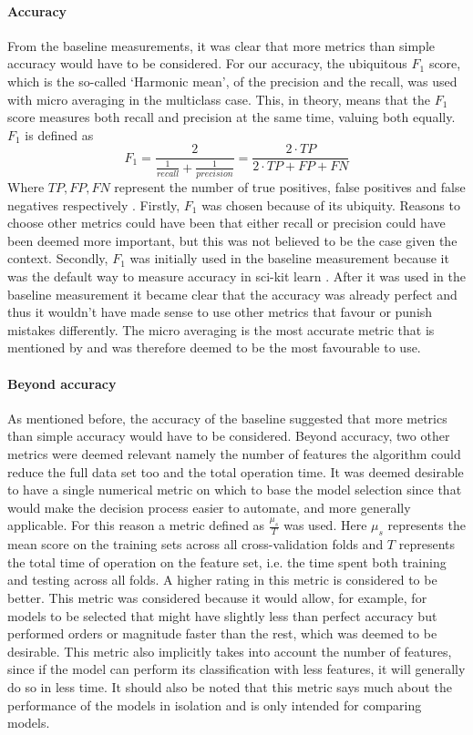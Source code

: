 \documentclass[british]{article}
\begin{document}
	\paragraph{Accuracy}From the baseline measurements, it was clear that more metrics than simple accuracy would have to be considered. For our accuracy, the ubiquitous $F_1$ score, which is the so-called `Harmonic mean', of the precision and the recall, was used with micro averaging in the multiclass case. This, in theory, means that the $F_1$ score measures both recall and precision at the same time, valuing both equally. $F_1$ is defined as $$F_1 = \frac{2}{\frac{1}{recall} + \frac{1}{precision}} = \frac{2\cdot TP}{2\cdot TP + FP + FN}$$ Where $TP, FP, FN$ represent the number of true positives, false positives and false negatives respectively \autocite{Lipton2014}. Firstly, $F_1$ was chosen because of its ubiquity. Reasons to choose other metrics could have been that either recall or precision could have been deemed more important, but this was not believed to be the case given the context. Secondly, $F_1$ was initially used in the baseline measurement because it was the default way to measure accuracy in sci-kit learn \autocite{Pedregosa2012}. After it was used in the baseline measurement it became clear that the accuracy was already perfect and thus it wouldn't have made sense to use other metrics that favour or punish mistakes differently. The micro averaging is the most accurate metric that is mentioned by \citeauthor{Lipton2014} and was therefore deemed to be the most favourable to use. 
	
	\paragraph{Beyond accuracy} As mentioned before, the accuracy of the baseline suggested that more metrics than simple accuracy would have to be considered. Beyond accuracy, two other metrics were deemed relevant namely the number of features the algorithm could reduce the full data set too and the total operation time. It was deemed desirable to have a single numerical metric on which to base the model selection since that would make the decision process easier to automate, and more generally applicable. For this reason a metric defined as $\frac{\mu_s}{T}$ was used. Here $\mu_s$ represents the mean score on the training sets across all cross-validation folds and $T$ represents the total time of operation on the feature set, i.e. the time spent both training and testing across all folds. A higher rating in this metric is considered to be better. This metric was considered because it would allow, for example, for models to be selected that might have slightly less than perfect accuracy but performed orders or magnitude faster than the rest, which was deemed to be desirable. This metric also implicitly takes into account the number of features, since if the model can perform its classification with less features, it will generally do so in less time. It should also be noted that this metric says much about the performance of the models in isolation and is only intended for comparing models.
	
\end{document}
